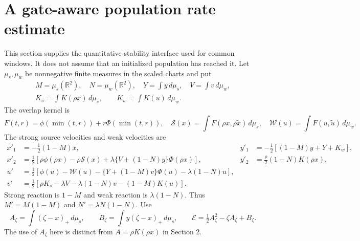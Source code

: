 \documentclass[11pt]{article}
\numberwithin{equation}{section}
\theoremstyle{remark}\newtheorem{remark}[theorem]{Remark}
\newcommand{\R}{\mathbb R}
\newcommand{\1}{\mathbf 1}
\begin{document}
\section{A gate-aware population rate estimate}
\label{inc:AN06:v2:populationrobustness}
This section supplies the quantitative stability interface used for common
windows. It does not assume that an initialized population has reached it.
Let $\mu_s,\mu_w$ be nonnegative finite measures in the scaled charts and put
\begin{gather*}
 M=\mu_s(\R^2),\quad N=\mu_w(\R^2),\quad
 Y=\int y\,d\mu_s,\quad V=\int v\,d\mu_w,\\
 K_s=\int K(\rho x)\,d\mu_s,\qquad K_w=\int K(u)\,d\mu_w.
\end{gather*}
The overlap kernel is
\[
 F(t,r)=\phi(\min(t,r))+r\Phi(\min(t,r)),\quad
 \mathcal S(x)=\int F(\rho x,\rho\widetilde x)\,d\mu_s,
 \quad \mathcal W(u)=\int F(u,\widetilde u)\,d\mu_w.
\]
The strong source velocities and weak velocities are
\begin{align}
 x'_1&=-\tfrac12(1-M)x,&
 y'_1&=-\tfrac12[(1-M)y+Y+K_w],
 \label{inc:AN06:v2:popsystem}\\
 x'_2&=\tfrac12[\rho\phi(\rho x)-\rho\mathcal S(x)
       +\lambda\{V+(1-N)y\}\Phi(\rho x)],&
 y'_2&=\tfrac\rho2(1-N)K(\rho x),\nonumber\\
 u'&=\tfrac12[\phi(u)-\mathcal W(u)-\{Y+(1-M)v\}\Phi(u)
                  -\lambda(1-N)u],\nonumber\\
 v'&=\tfrac12[\rho K_s-\lambda V-\lambda(1-N)v-(1-M)K(u)].\nonumber
\end{align}
Strong reaction is $1-M$ and weak reaction is $\lambda(1-N)$.
Thus $M'=M(1-M)$ and $N'=\lambda N(1-N)$.
Use
\[
 A_\zeta=\int(\zeta-x)_+\,d\mu_s,\qquad
 B_\zeta=\int y(\zeta-x)_+\,d\mu_s,\qquad
 \mathcal E=\tfrac12A_\zeta^2-\zeta A_\zeta+B_\zeta.
\]
The use of $A_\zeta$ here is distinct from $A=\rho K(\rho x)$ in Section 2.
\end{document}
